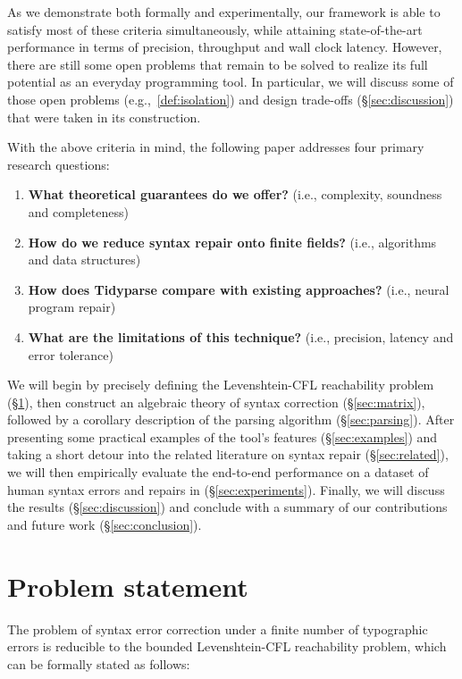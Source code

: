 \documentclass[sigplan,review,anonymous,acmsmall]{acmart}\settopmatter{printfolios=false,printccs=false,printacmref=false}
\begin{document}
As we demonstrate both formally and experimentally, our framework is able to satisfy most of these criteria simultaneously, while attaining state-of-the-art performance in terms of precision, throughput and wall clock latency. However, there are still some open problems that remain to be solved to realize its full potential as an everyday programming tool. In particular, we will discuss some of those open problems (e.g.,~\ref{def:isolation}) and design trade-offs (\S\ref{sec:discussion}) that were taken in its construction.

With the above criteria in mind, the following paper addresses four primary research questions:

\begin{enumerate}
  \item \textbf{What theoretical guarantees do we offer?} (i.e., complexity, soundness and completeness)
  \item \textbf{How do we reduce syntax repair onto finite fields?} (i.e., algorithms and data structures)
  \item \textbf{How does Tidyparse compare with existing approaches?} (i.e., neural program repair)
  \item \textbf{What are the limitations of this technique?} (i.e., precision, latency and error tolerance)
\end{enumerate}

We will begin by precisely defining the Levenshtein-CFL reachability problem (\S\ref{sec:problem}), then construct an algebraic theory of syntax correction (\S\ref{sec:matrix}), followed by a corollary description of the parsing algorithm (\S\ref{sec:parsing}). After presenting some practical examples of the tool's features (\S\ref{sec:examples}) and taking a short detour into the related literature on syntax repair (\S\ref{sec:related}), we will then empirically evaluate the end-to-end performance on a dataset of human syntax errors and repairs in (\S\ref{sec:experiments}). Finally, we will discuss the results (\S\ref{sec:discussion}) and conclude with a summary of our contributions and future work (\S\ref{sec:conclusion}).

\section{Problem statement}\label{sec:problem}

The problem of syntax error correction under a finite number of typographic errors is reducible to the bounded Levenshtein-CFL reachability problem, which can be formally stated as follows:
\end{document}
